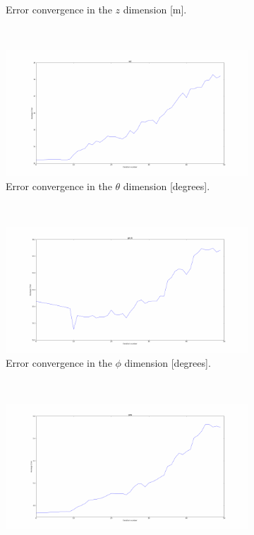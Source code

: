 \begin{figure}
\begin{subfigure}{0.45\textwidth}
    \caption{Error convergence in the $z$ dimension [m].}
\label{fig:err-convergence-z}
  \end{subfigure}
~
  \begin{subfigure}{0.45\textwidth}
    \includegraphics[width=\textwidth]{figures/chapter3/err_roll.pdf}
    \caption{Error convergence in the $\theta$ dimension [degrees].}
\label{fig:err-convergence-roll}
  \end{subfigure}
~
  \begin{subfigure}{0.45\textwidth}
    \includegraphics[width=\textwidth]{figures/chapter3/err_pitch.pdf}
    \caption{Error convergence in the $\phi$ dimension [degrees].}
\label{fig:err-convergence-pitch}
  \end{subfigure}
~
  \begin{subfigure}{0.45\textwidth}
    \includegraphics[width=\textwidth]{figures/chapter3/err_yaw.pdf}

\end{subfigure}
\end{figure}
